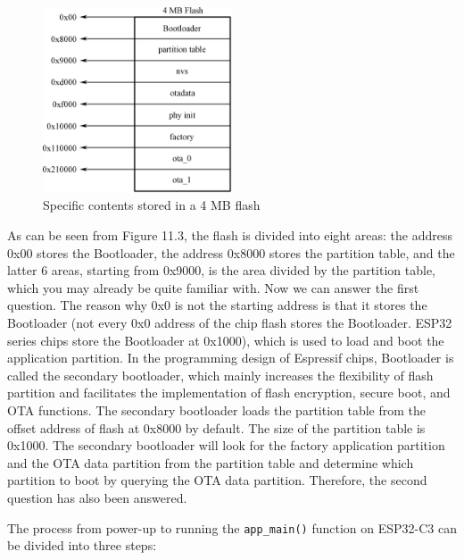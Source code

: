 \documentclass[a4paper,12pt,openany]{book}
\begin{document}
\begin{figure}[!h]
    \centering
    \includegraphics[width=0.5\textwidth]{D11Z/11-3}
    \caption{Specific contents stored in a 4 MB flash}
\end{figure}

As can be seen from Figure 11.3, the flash is divided into eight areas: the address 0x00 stores the Bootloader, the address 0x8000 stores the partition table, and the latter 6 areas, starting from 0x9000, is the area divided by the partition table, which you may already be quite familiar with. Now we can answer the first question. The reason why 0x0 is not the starting address is that it stores the Bootloader (not every 0x0 address of the chip flash stores the Bootloader. ESP32 series chips store the Bootloader at 0x1000), which is used to load and boot the application partition. In the programming design of Espressif chips, Bootloader is called the secondary bootloader, which mainly increases the flexibility of flash partition and facilitates the implementation of flash encryption, secure boot, and OTA functions. The secondary bootloader loads the partition table from the offset address of flash at 0x8000 by default. The size of the partition table is 0x1000. The secondary bootloader will look for the factory application partition and the OTA data partition from the partition table and determine which partition to boot by querying the OTA data partition. Therefore, the second question has also been answered.

The process from power-up to running the \verb|app_main()| function on ESP32-C3 can be divided into three steps:
\end{document}

